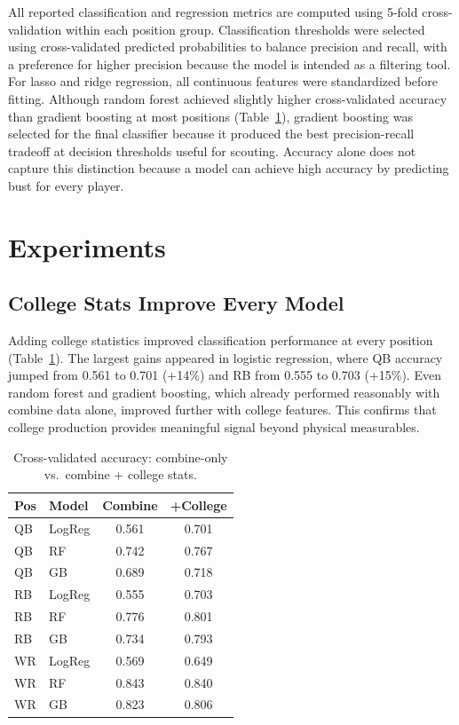 \documentclass[10pt,twocolumn]{article}
\begin{document}
All reported classification and regression metrics are computed using 5-fold cross-validation within each position group. Classification thresholds were selected using cross-validated predicted probabilities to balance precision and recall, with a preference for higher precision because the model is intended as a filtering tool. For lasso and ridge regression, all continuous features were standardized before fitting. Although random forest achieved slightly higher cross-validated accuracy than gradient boosting at most positions (Table~\ref{tab:cv}), gradient boosting was selected for the final classifier because it produced the best precision-recall tradeoff at decision thresholds useful for scouting. Accuracy alone does not capture this distinction because a model can achieve high accuracy by predicting bust for every player.


\section{Experiments}

\subsection{College Stats Improve Every Model}

Adding college statistics improved classification performance at every position (Table~\ref{tab:cv}). The largest gains appeared in logistic regression, where QB accuracy jumped from 0.561 to 0.701 (+14\%) and RB from 0.555 to 0.703 (+15\%). Even random forest and gradient boosting, which already performed reasonably with combine data alone, improved further with college features. This confirms that college production provides meaningful signal beyond physical measurables.

\begin{table}[H]
\centering
\small
\begin{tabular}{llcc}
\toprule
Pos & Model & Combine & +College \\
\midrule
QB & LogReg & 0.561 & 0.701 \\
QB & RF & 0.742 & 0.767 \\
QB & GB & 0.689 & 0.718 \\
\midrule
RB & LogReg & 0.555 & 0.703 \\
RB & RF & 0.776 & 0.801 \\
RB & GB & 0.734 & 0.793 \\
\midrule
WR & LogReg & 0.569 & 0.649 \\
WR & RF & 0.843 & 0.840 \\
WR & GB & 0.823 & 0.806 \\
\bottomrule
\end{tabular}
\caption{Cross-validated accuracy: combine-only vs.\ combine + college stats.}
\label{tab:cv}
\end{table}
\end{document}
